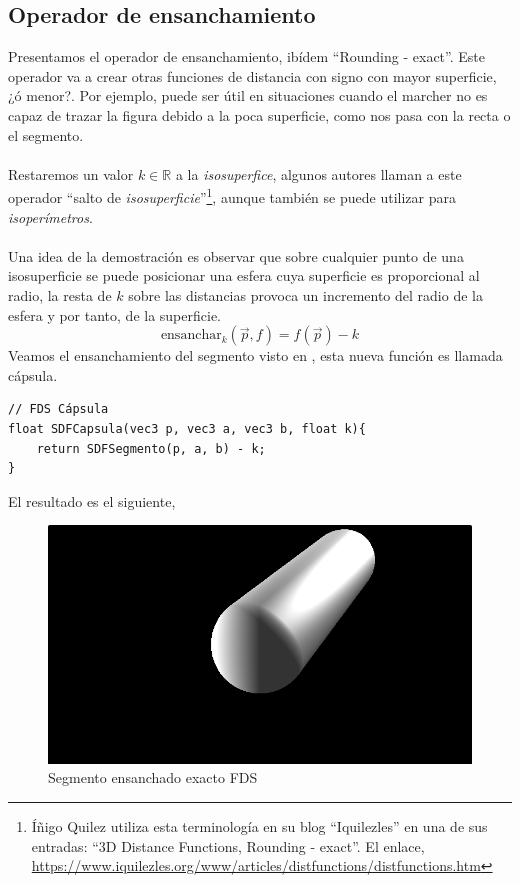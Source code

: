 \subsection{Operador de ensanchamiento}
Presentamos el operador de ensanchamiento, ibídem \enquote{Rounding - exact}. Este operador va a crear otras funciones de distancia con signo con mayor superficie, ¿ó menor?. Por ejemplo, puede ser útil en situaciones cuando el marcher no es capaz de trazar la figura debido a la poca superficie, como nos pasa con la recta o el segmento.\\\\
Restaremos un valor \(k\in\mathbb{R}\) a la \textit{isosuperfice}, algunos autores llaman a este operador \enquote{salto de \textit{isosuperficie}}\footnote{Íñigo Quilez utiliza esta terminología en su blog \enquote{Iquilezles} en una de sus entradas: \enquote{3D Distance Functions, Rounding - exact}. El enlace, \url{https://www.iquilezles.org/www/articles/distfunctions/distfunctions.htm}}, aunque también se puede utilizar para \textit{isoperímetros}.\\\\ 
Una idea de la demostración es observar que sobre cualquier punto de una isosuperficie se puede posicionar una esfera cuya superficie es proporcional al radio, la resta de \(k\) sobre las distancias provoca un incremento del radio de la esfera y por tanto, de la superficie.  
\[\text{ensanchar}_k(\Vec{p}, f)=f(\Vec{p})-k\]
Veamos el ensanchamiento del segmento visto en , esta nueva función es llamada cápsula.
\begin{lstlisting}
// FDS Cápsula
float SDFCapsula(vec3 p, vec3 a, vec3 b, float k){
	return SDFSegmento(p, a, b) - k;
}
\end{lstlisting}
El resultado es el siguiente,
\begin{figure}[H]
  \centering
  \captionsetup{justification=centering}%
  \includegraphics[width=1.0\textwidth]{secciones/imagenes/sdf/3d/sdf_capsula.png}
  \caption{Segmento ensanchado exacto FDS}
  \label{fig:capsula}
\end{figure}

